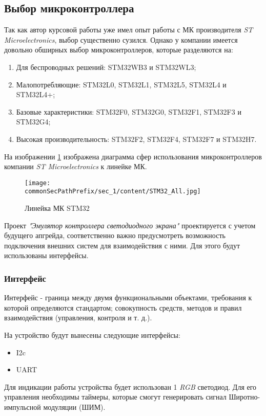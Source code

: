 \subsection{Выбор микроконтроллера}

Так как автор курсовой работы уже имел опыт работы с МК производителя \textit{ST Microelectronics}, выбор существенно сузился. Однако у компании имеется довольно обширных выбор микроконтроллеров, которые разделяются на:
\begin{enumerate}
    \item Для беспроводных решений: STM32WB3 и STM32WL3;
    \item Малопотребляющие:  STM32L0, STM32L1,  STM32L5, STM32L4 и STM32L4+;
    \item Базовые характеристики: STM32F0, STM32G0, STM32F1, STM32F3 и STM32G4;
    \item Высокая производительность: STM32F2, STM32F4, STM32F7 и STM32H7.
\end{enumerate}

На изображении \ref{fig:stm32_options} изображена диаграмма сфер использования микроконтроллеров компании \textit{ST Microelectronics} к линейке МК.
\begin{figure}[ht]
    \centering
    \texttt{[image: \\commonSecPathPrefix/sec\_1/content/STM32\_All.jpg]}
    \caption{Линейка МК STM32}
    \label{fig:stm32_options}
\end{figure}

Проект \textit{"Эмулятор контроллера светодиодного экрана"} проектируется с учетом будущего апгрейда, соответственно важно предусмотреть возможность подключения внешних систем для взаимодействия с ними. Для этого будут использованы интерфейсы.

\subsubsection{Интерфейс}

Интерфейс - граница между двумя функциональными объектами, требования к которой определяются стандартом; совокупность средств, методов и правил взаимодействия (управления, контроля и т. д.).

На устройство будут вынесены следующие интерфейсы:
\begin{itemize}
    \item I2c
    \item UART
\end{itemize}

Для индикации работы устройства будет использован 1 \textit{RGB} светодиод. Для его управления необходимы таймеры, которые смогут генерировать сигнал Широтно-импульсной модуляции (ШИМ).

